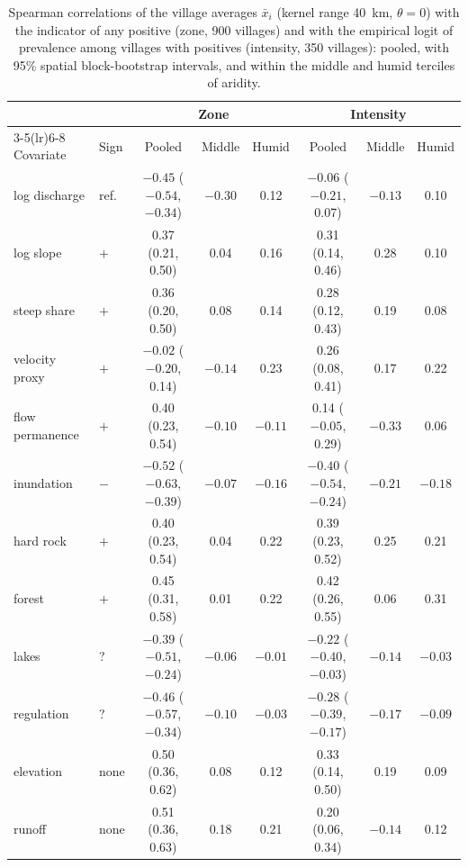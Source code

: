 \documentclass[11pt,a4paper]{article}
\begin{document}
\begin{table}[H]
\centering
\footnotesize\setlength{\tabcolsep}{4pt}
\caption{Spearman correlations of the village averages $\bar x_i$ (kernel range 40~km, $\theta = 0$) with the indicator of any positive (zone, 900 villages) and with the empirical logit of prevalence among villages with positives (intensity, 350 villages): pooled, with 95\% spatial block-bootstrap intervals, and within the middle and humid terciles of aridity.}
\label{tab:eda}
\begin{tabular}{llcccccc}
\toprule
 & & \multicolumn{3}{c}{Zone} & \multicolumn{3}{c}{Intensity} \\
\cmidrule(lr){3-5}\cmidrule(lr){6-8}
Covariate & Sign & Pooled & Middle & Humid & Pooled & Middle & Humid \\
\midrule
log discharge & ref. & $-0.45$ ($-0.54$, $-0.34$) & $-0.30$ & 0.12 & $-0.06$ ($-0.21$, 0.07) & $-0.13$ & 0.10 \\
log slope & $+$ & 0.37 (0.21, 0.50) & 0.04 & 0.16 & 0.31 (0.14, 0.46) & 0.28 & 0.10 \\
steep share & $+$ & 0.36 (0.20, 0.50) & 0.08 & 0.14 & 0.28 (0.12, 0.43) & 0.19 & 0.08 \\
velocity proxy & $+$ & $-0.02$ ($-0.20$, 0.14) & $-0.14$ & 0.23 & 0.26 (0.08, 0.41) & 0.17 & 0.22 \\
flow permanence & $+$ & 0.40 (0.23, 0.54) & $-0.10$ & $-0.11$ & 0.14 ($-0.05$, 0.29) & $-0.33$ & 0.06 \\
inundation & $-$ & $-0.52$ ($-0.63$, $-0.39$) & $-0.07$ & $-0.16$ & $-0.40$ ($-0.54$, $-0.24$) & $-0.21$ & $-0.18$ \\
hard rock & $+$ & 0.40 (0.23, 0.54) & 0.04 & 0.22 & 0.39 (0.23, 0.52) & 0.25 & 0.21 \\
forest & $+$ & 0.45 (0.31, 0.58) & 0.01 & 0.22 & 0.42 (0.26, 0.55) & 0.06 & 0.31 \\
lakes & ? & $-0.39$ ($-0.51$, $-0.24$) & $-0.06$ & $-0.01$ & $-0.22$ ($-0.40$, $-0.03$) & $-0.14$ & $-0.03$ \\
regulation & ? & $-0.46$ ($-0.57$, $-0.34$) & $-0.10$ & $-0.03$ & $-0.28$ ($-0.39$, $-0.17$) & $-0.17$ & $-0.09$ \\
elevation & none & 0.50 (0.36, 0.62) & 0.08 & 0.12 & 0.33 (0.14, 0.50) & 0.19 & 0.09 \\
runoff & none & 0.51 (0.36, 0.63) & 0.18 & 0.21 & 0.20 (0.06, 0.34) & $-0.14$ & 0.12 \\
\bottomrule
\end{tabular}
\end{table}
\end{document}
